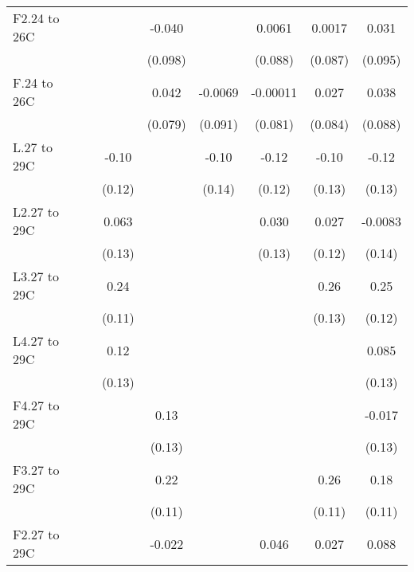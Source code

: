 \documentclass[paper=letterpaper, fontsize=11pt]{article} %
\begin{document}
{\begin{landscape}
\begin{longtable}{l*{7}{c}}
F2.24 to 26C        &            &            &      -0.040&            &      0.0061&      0.0017&       0.031\\
                    &            &            &     (0.098)&            &     (0.088)&     (0.087)&     (0.095)\\
F.24 to 26C         &            &            &       0.042&     -0.0069&    -0.00011&       0.027&       0.038\\
                    &            &            &     (0.079)&     (0.091)&     (0.081)&     (0.084)&     (0.088)\\
L.27 to 29C         &            &       -0.10&            &       -0.10&       -0.12&       -0.10&       -0.12\\
                    &            &      (0.12)&            &      (0.14)&      (0.12)&      (0.13)&      (0.13)\\
L2.27 to 29C        &            &       0.063&            &            &       0.030&       0.027&     -0.0083\\
                    &            &      (0.13)&            &            &      (0.13)&      (0.12)&      (0.14)\\
L3.27 to 29C        &            &        0.24&            &            &            &        0.26&        0.25\\
                    &            &      (0.11)&            &            &            &      (0.13)&      (0.12)\\
L4.27 to 29C        &            &        0.12&            &            &            &            &       0.085\\
                    &            &      (0.13)&            &            &            &            &      (0.13)\\
F4.27 to 29C        &            &            &        0.13&            &            &            &      -0.017\\
                    &            &            &      (0.13)&            &            &            &      (0.13)\\
F3.27 to 29C        &            &            &        0.22&            &            &        0.26&        0.18\\
                    &            &            &      (0.11)&            &            &      (0.11)&      (0.11)\\
F2.27 to 29C        &            &            &      -0.022&            &       0.046&       0.027&       0.088\\

\end{longtable}
\end{landscape}}
\end{document}
